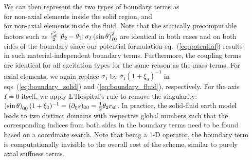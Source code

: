 We can then represent the two types of 
boundary terms as
%
\eqa \label{eq:boundary_solid}
\nonumber\\
\ena
%
for non-axial elements inside the solid region, and
%
\eqa \label{eq:boundary_fluid}
\nonumber\\
\ena
%
for non-axial elements inside the fluid. Note that the statically 
precomputable factors such as
$\frac{r^2_{\rm sf}}{2}\left|\theta_2-\theta_1\right|\sigma_I
\left(\sin{\theta}\right)_{I0}^2$ 
are identical in both cases and on both sides of the boundary since our
potential formulation eq.~(\ref{eq:potential}) results in such 
material-independent boundary terms. Furthermore, the coupling terms are 
identical for all excitation types for the same reason as the mass terms.
For axial elements, we again replace 
$\sigma_I$ by $\bar{\sigma}_I\left(1+\xi_0\right)^{-1}$
in eqs~(\ref{eq:boundary_solid}) and (\ref{eq:boundary_fluid}), respectively.
For the axis $I=0$ itself, we apply L'Hospital's rule to remove 
the singularity: 
$\textstyle{\left(\sin{\theta}\right)_{00} (1+\xi_0)^{-1}=
(\partial_\xi{s})_{00}=\frac{1}{2}\theta_2r_{\rm sf}}$. 
%
In practice, the solid-fluid earth model leads to two distinct domains 
with respective global numbers such that the corresponding indices from 
both sides in the boundary terms need to be found based on a coordinate search.
Note that being a 1-D operator, the boundary term is computationally invisible 
to the overall cost of the scheme, similar to purely axial stiffness terms.


